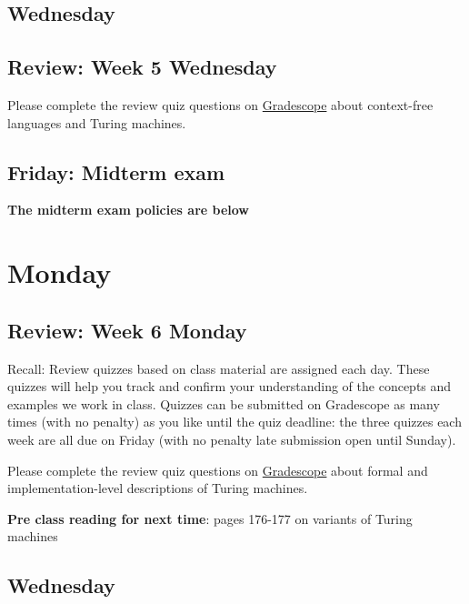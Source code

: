 \newpage
\subsection*{Wednesday}




\newpage
\subsection*{Review: Week 5 Wednesday}

Please complete the review quiz questions on \href{http://gradescope.com}{Gradescope} about 
context-free languages and Turing machines.


\newpage
\subsection*{Friday: Midterm exam}

{\bf The midterm exam policies are below}

\newpage

\section*{Monday}


    
\newpage
\subsection*{Review: Week 6 Monday}


Recall: Review quizzes based on class material are assigned each day. 
These quizzes will help you track and confirm your understanding of the concepts and examples 
we work in class. Quizzes can be submitted on Gradescope as many times (with no penalty) as 
you like until the quiz deadline: the three quizzes each week are all due on Friday (with no penalty 
late submission open until Sunday).

Please complete the review quiz questions on \href{http://gradescope.com}{Gradescope} about 
formal and implementation-level descriptions of Turing machines.

{\bf Pre class reading for next time}: pages 176-177 on variants of Turing machines


\newpage
\subsection*{Wednesday}

